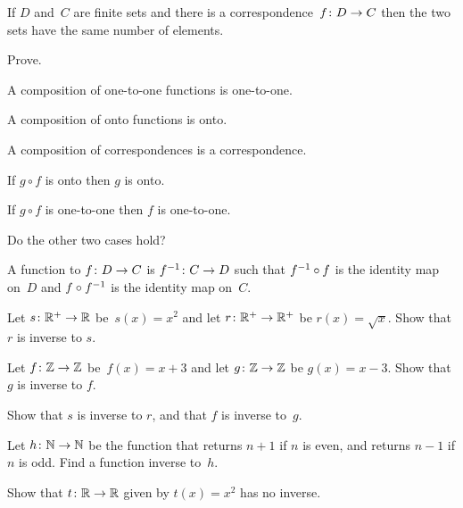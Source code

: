 \documentclass{ibl}
\begin{document}
\begin{ex}
If $D$ and~$C$ are finite sets and there is a 
correspondence~$\mbox{$f\colon D\to C$}$
then the two sets
have the same number of elements.  
\end{ex}

\begin{ex} Prove.
\begin{exes}
\item A composition of one-to-one functions is one-to-one.
\item A composition of onto functions is onto.
\item A composition of correspondences is a correspondence.    
\end{exes}
\end{ex}

\begin{ex} 
\begin{exes}
\item If $g\circ f$ is onto then $g$ is onto.
\item If $g\circ f$ is one-to-one then $f$ is one-to-one.
\item Do the other two cases hold?     
\end{exes}
\end{ex}

\begin{df}
A function  to $\mbox{$f\colon D\to C$}$ is 
$\mbox{$f^{-1}\colon C\to D$}$ such that 
$f^{-1}\mathbin{\circ} f$ is the identity map on~$D$ and
$f\mathbin{\circ} f^{-1}$ is the identity map on~$C$.
\end{df}

\begin{ex} 
\begin{exes}
\item Let $\mbox{$s\colon \mathbb{R}^+\to \mathbb{R}$}$ be~$s(x)=x^2$ and let
  $\mbox{$r\colon \mathbb{R}^+\to \mathbb{R}^+$}$ be $r(x)=\sqrt{x}$.
  Show that $r$ is inverse to $s$.    
\item Let $\mbox{$f\colon \mathbb{Z}\to \mathbb{Z}$}$ be~$f(x)=x+3$ and let
  $\mbox{$g\colon \mathbb{Z}\to \mathbb{Z}$}$ be $g(x)=x-3$.
  Show that $g$ is inverse to $f$.
\item Show that $s$ is inverse to $r$, and that $f$ is inverse to~$g$.
\item Let $\mbox{$h\colon \mathbb{N}\to \mathbb{N}$}$ be the function that returns
  $n+1$ if $n$ is even, and returns $n-1$ if $n$ is odd.
  Find a function inverse to~$h$.
\item Show that $\mbox{$t\colon \mathbb{R}\to \mathbb{R}$}$ given by $t(x)=x^2$
  has no inverse.
\end{exes}
\end{ex}
\end{document}
